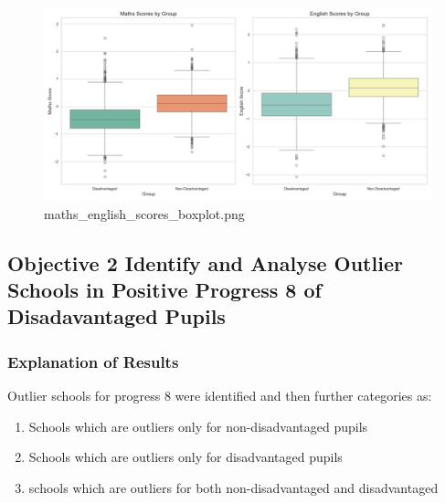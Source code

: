 \documentclass[
  letterpaper,
  DIV=11,
  numbers=noendperiod]{scrartcl}
\begin{document}
\begin{figure}[H]

{\centering \includegraphics{images/obj1_maths_english_scores_boxplot.png}

}

\caption{maths\_english\_scores\_boxplot.png}

\end{figure}%

\subsection{Objective 2 Identify and Analyse Outlier Schools in Positive
Progress 8 of Disadavantaged
Pupils}\label{objective-2-identify-and-analyse-outlier-schools-in-positive-progress-8-of-disadavantaged-pupils}

\subsubsection{Explanation of Results}\label{explanation-of-results}

Outlier schools for progress 8 were identified and then further
categories as:

\begin{enumerate}
\def\labelenumi{\alph{enumi})}
\item
  Schools which are outliers only for non-disadvantaged pupils
\item
  Schools which are outliers only for disadvantaged pupils
\item
  schools which are outliers for both non-disadvantaged and
  disadvantaged
\end{enumerate}
\end{document}
